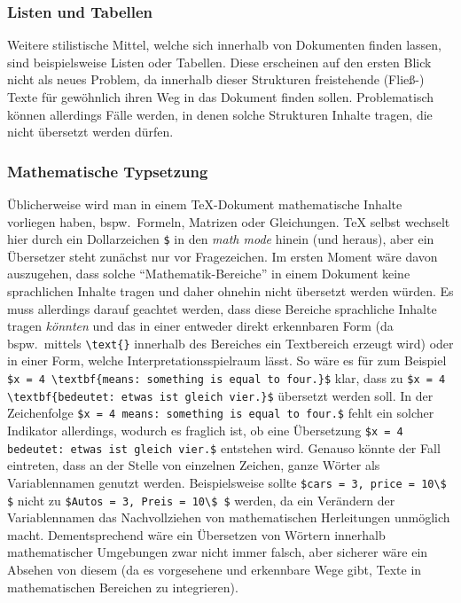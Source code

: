 \subsubsection{Listen und Tabellen}%
Weitere stilistische Mittel, welche sich innerhalb von Dokumenten finden lassen, sind beispielsweise Listen oder Tabellen. Diese erscheinen auf den ersten Blick nicht als neues Problem, da innerhalb dieser Strukturen freistehende (Fließ-) Texte für gewöhnlich ihren Weg in das Dokument finden sollen. Problematisch können allerdings Fälle werden, in denen solche Strukturen Inhalte tragen, die nicht übersetzt werden dürfen.  

\subsubsection{Mathematische Typsetzung}
Üblicherweise wird man in einem \TeX{}-Dokument mathematische Inhalte vorliegen haben, bspw.\ Formeln, Matrizen oder Gleichungen. \TeX{} selbst wechselt hier durch ein Dollarzeichen \verb|$| in den \textit{math mode} hinein (und heraus), aber ein Übersetzer steht zunächst nur vor Fragezeichen. Im ersten Moment wäre davon auszugehen, dass solche \enquote{Mathematik-Bereiche} in einem Dokument keine sprachlichen Inhalte tragen und daher ohnehin nicht übersetzt werden würden. Es muss allerdings darauf geachtet werden, dass diese Bereiche sprachliche Inhalte tragen \textit{könnten} und das in einer entweder direkt erkennbaren Form (da bspw.\ mittels \verb|\text{}| innerhalb des Bereiches ein Textbereich erzeugt wird) oder in einer Form, welche Interpretationsspielraum lässt. 
So wäre es für zum Beispiel \verb|$x = 4 \textbf{means: something is equal to four.}$| klar, dass zu \verb|$x = 4 \textbf{bedeutet: etwas ist gleich vier.}$| übersetzt werden soll. 
In der Zeichenfolge \verb|$x = 4 means: something is equal to four.$| fehlt ein solcher Indikator allerdings, wodurch es fraglich ist, ob eine Übersetzung \verb|$x = 4 bedeutet: etwas ist gleich vier.$| entstehen wird. Genauso könnte der Fall eintreten, dass an der Stelle von einzelnen Zeichen, ganze Wörter als Variablennamen genutzt werden. Beispielsweise sollte \verb|$cars = 3, price = 10\$ $| nicht zu \verb|$Autos = 3, Preis = 10\$ $| werden, da ein Verändern der Variablennamen das Nachvollziehen von mathematischen Herleitungen unmöglich macht. Dementsprechend wäre ein Übersetzen von Wörtern innerhalb mathematischer Umgebungen zwar nicht immer falsch, aber sicherer wäre ein Absehen von diesem (da es vorgesehene und erkennbare Wege gibt, Texte in mathematischen Bereichen zu integrieren).

